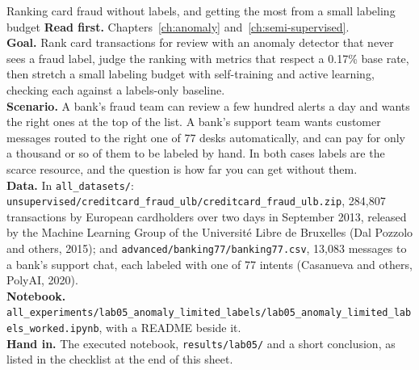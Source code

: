 
\begin{labproject}{Ranking card fraud without labels, and getting the most from a small labeling budget}
\textbf{Read first.} Chapters~\ref{ch:anomaly} and~\ref{ch:semi-supervised}.\\
\textbf{Goal.} Rank card transactions for review with an anomaly detector that never sees a fraud label, judge the ranking with metrics that respect a 0.17\% base rate, then stretch a small labeling budget with self-training and active learning, checking each against a labels-only baseline.\\
\textbf{Scenario.} A bank's fraud team can review a few hundred alerts a day and wants the right ones at the top of the list. A bank's support team wants customer messages routed to the right one of 77 desks automatically, and can pay for only a thousand or so of them to be labeled by hand. In both cases labels are the scarce resource, and the question is how far you can get without them.\\
\textbf{Data.} In \texttt{all\_datasets/}: \texttt{unsupervised/\allowbreak creditcard\_fraud\_ulb/\allowbreak creditcard\_fraud\_ulb.zip}, 284,807 transactions by European cardholders over two days in September 2013, released by the Machine Learning Group of the Universit\'e Libre de Bruxelles (Dal Pozzolo and others, 2015); and \texttt{advanced/\allowbreak banking77/\allowbreak banking77.csv}, 13,083 messages to a bank's support chat, each labeled with one of 77 intents (Casanueva and others, PolyAI, 2020).\\
\textbf{Notebook.} \texttt{all\_experiments/\allowbreak lab05\_anomaly\_limited\_labels/\allowbreak lab05\_anomaly\_limited\_labels\_worked.ipynb}, with a README beside it.\\
\textbf{Hand in.} The executed notebook, \texttt{results/lab05/} and a short conclusion, as listed in the checklist at the end of this sheet.
\end{labproject}


